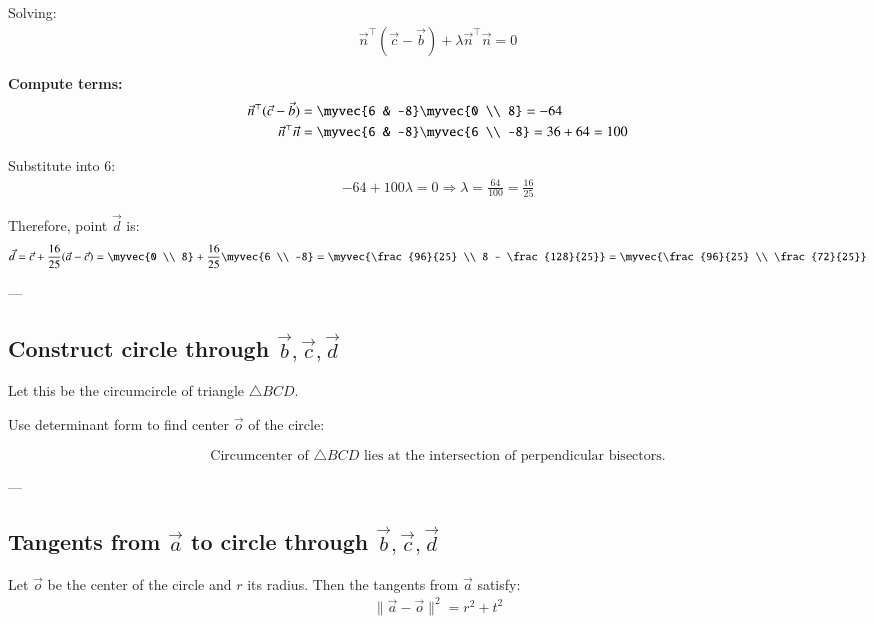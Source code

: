 \documentclass[journal]{IEEEtran}
\begin{document}
Solving:
\begin{align}
\vec{n}^\top (\vec{c} - \vec{b}) + \lambda \vec{n}^\top \vec{n} = 0 \label{6}
\end{align}

\textbf{Compute terms:}
\begin{align}
\vec{n}^\top (\vec{c} - \vec{b}) &= \myvec{6 & -8} \myvec{0 \\ 8} = -64 \label{7} \\
\vec{n}^\top \vec{n} &= \myvec{6 & -8} \myvec{6 \\ -8} = 36 + 64 = 100 \label{8}
\end{align}

Substitute into {6}:
\begin{align}
-64 + 100 \lambda = 0 \Rightarrow \lambda = \frac{64}{100} = \frac{16}{25} \label{9}
\end{align}

Therefore, point \(\vec{d}\) is:
\begin{align}
\vec{d} = \vec{c} + \frac{16}{25}(\vec{a} - \vec{c}) = \myvec{0 \\ 8} + \frac{16}{25} \myvec{6 \\ -8} = \myvec{\frac{96}{25} \\ 8 - \frac{128}{25}} = \myvec{\frac{96}{25} \\ \frac{72}{25}} \label{10}
\end{align}

---

\subsection*{Construct circle through \( \vec{b}, \vec{c}, \vec{d} \)}

Let this be the circumcircle of triangle \( \triangle BCD \).

Use determinant form to find center \( \vec{o} \) of the circle:

\[
\text{Circumcenter of } \triangle BCD \text{ lies at the intersection of perpendicular bisectors.}
\]



---

\subsection*{Tangents from \( \vec{a} \) to circle through \( \vec{b}, \vec{c}, \vec{d} \)}

Let \( \vec{o} \) be the center of the circle and \( r \) its radius. Then the tangents from \( \vec{a} \) satisfy:
\begin{align}
\| \vec{a} - \vec{o} \|^2 = r^2 + t^2 \label{11}
\end{align}
\end{document}
